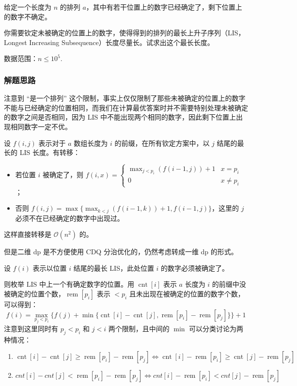 \documentclass[a4paper, UTF8]{ctexart}
\begin{document}
给定一个长度为 \(n\) 的排列
\(a\)，其中有若干位置上的数字已经确定了，剩下位置上的数字不确定。

你需要钦定未被确定的位置上的数字，使得得到的排列的最长上升子序列（LIS，Longest
Increasing Subsequence）长度尽量长。试求出这个最长长度。

数据范围：\(n\leq 10^5\).

\subsubsection{解题思路}

注意到 ``是一个排列''
这个限制，事实上仅仅限制了那些未被确定的位置上的数字不能与已经确定的位置相同，而我们在计算最优答案时并不需要特别处理未被确定的数字之间是否相同，因为
LIS 中不能出现两个相同的数字，因此剩下位置上出现相同数字一定不优。

设 \(f(i,j)\) 表示对于 \(a\) 数组长度为 \(i\)
的前缀，在所有钦定方案中，以 \(j\) 结尾的最长的 LIS 长度。有转移：

\begin{itemize}
\item
  若位置 \(i\) 被确定了，则
  \(f(i,x)=\begin{cases}\max_{j < p_i}(f(i-1,j))+1&x=p_i\\0&x\not=p_i\end{cases}\)；
\item
  否则 \(f(i,j)=\max\{\max_{k < j}(f(i-1,k))+1,f(i-1,j)\}\)，这里的
  \(j\) 必须不在已经确定的数字中出现过。
\end{itemize}

这样直接转移是 \(\mathcal{O}(n^2)\) 的。

但是二维 dp 是不方便使用 CDQ 分治优化的，仍然考虑转成一维 dp 的形式。

设 \(f(i)\) 表示以位置 \(i\) 结尾的最长 LIS，此处位置 \(i\)
的数字必须被确定了。

则枚举 LIS 中上一个有确定数字的位置。用 \(\operatorname{cnt}[i]\) 表示
\(a\) 长度为 \(i\)
的前缀中没被确定的位置个数，\(\operatorname{rem}[p_i]\) 表示 \(< p_i\)
且未出现在被确定的位置的数字个数，可以得到： \[
f(i)=\max_{p_j < p_i}\{f(j)+\min\{\operatorname{cnt}[i]-\operatorname{cnt}[j],\operatorname{rem}[p_i]-\operatorname{rem}[p_j]\}\}+1
\] 注意到这里同时有 \(p_j<p_i\) 和 \(j<i\) 两个限制，且中间的 \(\min\)
可以分类讨论为两种情况：

\begin{enumerate}
\def\labelenumi{\arabic{enumi}.}
\tightlist
\item
  \(\operatorname{cnt}[i]-\operatorname{cnt}[j]\geq\operatorname{rem}[p_i]-\operatorname{rem}[p_j] \iff \operatorname{cnt}[i]-\operatorname{rem}[p_i]\geq\operatorname{cnt}[j]-\operatorname{rem}[p_j]\)
\item
  \(cnt[i]-cnt[j]<\operatorname{rem}[p_i]-\operatorname{rem}[p_j] \iff cnt[i]-\operatorname{rem}[p_i]<cnt[j]-\operatorname{rem}[p_j]\)
\end{enumerate}
\end{document}
